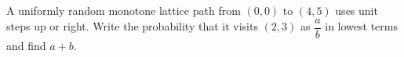 A uniformly random monotone lattice path from $(0,0)$ to $(4,5)$ uses unit steps up or right. Write the probability that it visits $(2,3)$ as $\dfrac{a}{b}$ in lowest terms and find $a+b$.
